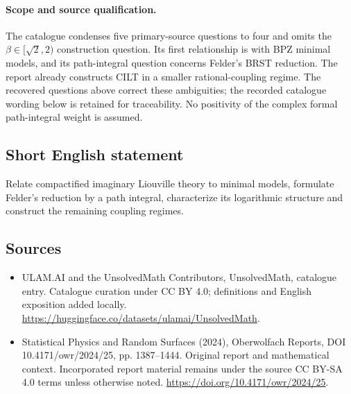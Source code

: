 \documentclass[11pt]{article}
\begin{document}
\paragraph{Scope and source qualification.}The catalogue condenses five primary-source questions to four and omits the $\beta\in[\sqrt2,2)$ construction question. Its first relationship is with BPZ minimal models, and its path-integral question concerns Felder's BRST reduction. The report already constructs CILT in a smaller rational-coupling regime. The recovered questions above correct these ambiguities; the recorded catalogue wording below is retained for traceability. No positivity of the complex formal path-integral weight is assumed.
\subsection{Short English statement}
Relate compactified imaginary Liouville theory to minimal models, formulate Felder's reduction by a path integral, characterize its logarithmic structure and construct the remaining coupling regimes.
\subsection{Sources}
\begin{itemize}
\item[\hypertarget{source:statement:1}{S1}] ULAM.AI and the UnsolvedMath Contributors, UnsolvedMath, catalogue entry. Catalogue curation under CC BY 4.0; definitions and English exposition added locally.
\url{https://huggingface.co/datasets/ulamai/UnsolvedMath}.
\item[\hypertarget{source:statement:2}{S2}] Statistical Physics and Random Surfaces (2024), Oberwolfach Reports, DOI 10.4171/owr/2024/25, pp. 1387--1444. Original report and mathematical context. Incorporated report material remains under the source CC BY-SA 4.0 terms unless otherwise noted.
\url{https://doi.org/10.4171/owr/2024/25}.
\end{itemize}
\label{end:statement}
\end{document}

